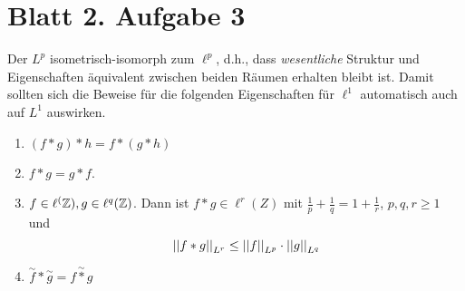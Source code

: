 \documentclass[
 ngerman]{report}
\begin{document}
\section{Blatt 2. Aufgabe 3}
Der $L^p$ isometrisch-isomorph zum $\ell^p$, d.h., dass 
\emph{wesentliche} Struktur und Eigenschaften äquivalent zwischen beiden 
Räumen erhalten bleibt ist. Damit sollten sich die Beweise für
die folgenden Eigenschaften für $\ell^1$ automatisch auch auf
$L^1$ auswirken.

\begin{enumerate}[1)]
	\item $(f \ast g) \ast h = f \ast (g \ast h)$ 
	\item $f\ast g = g \ast f$. 
	\item $f \in \ell^(\mathbb{Z}), g \in \ell^q(\mathbb{Z})$. Dann ist $f\ast g \in \ell^r (Z)$ 
		mit $ \frac {1} {p} + \frac {1} {q} = 1 + \frac {1} {r}$, $p,q,r \geq 1$
		und 
		$$ \left\lvert \left\lvert f\ast g \right\rvert \right\rvert_{L^r} \leq \left\lvert \left\lvert f \right\rvert \right\rvert_{L^p} \cdot  \left\lvert \left\lvert g \right\rvert \right\rvert_{L^q}$$
	\item $\overset{\sim}{f} \ast \overset{\sim}{g} = \overset{\sim}{f\ast g}$
\end{enumerate}
\end{document}
